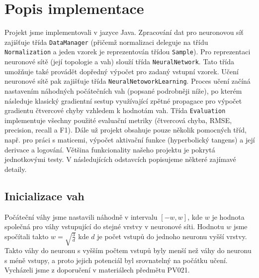 \documentclass[a4paper, 10pt]{article}
\begin{document}
\section{Popis implementace}
  \begin{multicols}{2}
    Projekt jsme implementovali v jazyce Java.
    Zpracování dat pro neuronovou síť zajišťuje třída \texttt{DataManager} (přičemž normalizaci deleguje na třídu \texttt{Normalization} a jeden vzorek je reprezentován třídou \texttt{Sample}).
    Pro reprezentaci neuronové sítě (její topologie a vah) slouží třída \texttt{NeuralNetwork}. Tato třída umožňuje také provádět dopředný výpočet pro zadaný vstupní vzorek.
    Učení neuronové sítě pak zajišťuje třída \texttt{NeuralNetoworkLearning}. Proces učení začíná nastavením náhodných počátečních vah (popsané podrobněji níže), po kterém následuje klasický gradientní sestup využívající zpětné propagace pro výpočet gradientu čtvercové chyby vzhledem k hodnotám vah.
    Třída \texttt{Evaluation} implementuje všechny použité evaluační metriky (čtvercová chyba, RMSE, precision, recall a F1).
    Dále už projekt obsahuje pouze několik pomocných tříd, např. pro práci s maticemi, výpočet aktivační funkce (hyperbolický tangens) a její derivace a logování.
    Většina funkcionality našeho projektu je pokrytá jednotkovými testy.
    V následujících odstavcích popisujeme některé zajímavé detaily.

    \subsection{Inicializace vah}
      Počáteční váhy jsme nastavili náhodně v intervalu $[-w,w]$, kde $w$ je hodnota společná pro váhy vstupující do stejné vrstvy v neuronové síti. Hodnotu $w$ jsme spočítali takto $w = \sqrt{\frac{3}{d}}$ kde $d$ je počet vstupů do jednoho neuronu vyšší vrstvy. Takto váhy do neuronu s vyšším počtem vstupů byly menší než váhy do neuronu s méně vstupy, a proto jejich potenciál byl srovnatelný na počátku učení. Vycházeli jsme z doporučení v materiálech předmětu PV021.


\end{multicols}
\end{document}

